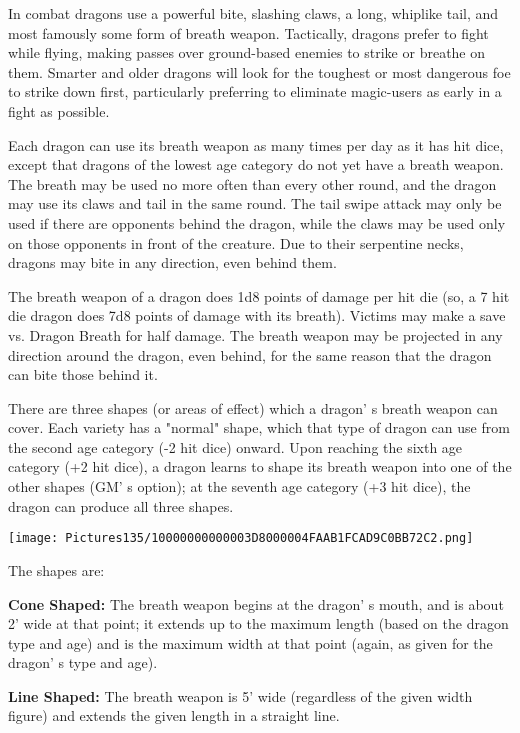 \documentclass[a4paper,twoside,openany,10pt]{book}
\begin{document}
\begin{multicols}{2}
In combat dragons use a powerful bite, slashing claws, a long, whiplike tail, and most famously some form of breath weapon. Tactically, dragons prefer to fight while flying, making passes over ground-based enemies to strike or breathe on them. Smarter and older dragons will look for the toughest or most dangerous foe to strike down first, particularly preferring to eliminate magic-users as early in a fight as possible.

Each dragon can use its breath weapon as many times per day as it has hit dice, except that dragons of the lowest age category do not yet have a breath weapon. The breath may be used no more often than every other round, and the dragon may use its claws and tail in the same round. The tail swipe attack may only be used if there are opponents behind the dragon, while the claws may be used only on those opponents in front of the creature. Due to their serpentine necks, dragons may bite in any direction, even behind them.

The breath weapon of a dragon does 1d8 points of damage per hit die (so, a 7 hit die dragon does 7d8 points of damage with its breath). Victims may make a save vs. Dragon Breath for half damage. The breath weapon may be projected in any direction around the dragon, even behind, for the same reason that the dragon can bite those behind it.

There are three shapes (or areas of effect) which a dragon' s breath weapon can cover. Each variety has a "normal" shape, which that type of dragon can use from the second age category (-2 hit dice) onward. Upon reaching the sixth age category (+2 hit dice), a dragon learns to shape its breath weapon into one of the other shapes (GM' s option); at the seventh age category (+3 hit dice), the dragon can produce all three shapes.


\begin{center}
	\texttt{[image: Pictures135/10000000000003D8000004FAAB1FCAD9C0BB72C2.png]}
\end{center}\medskip

The shapes are:

\textbf{Cone Shaped:} The breath weapon begins at the dragon' s mouth, and is about 2' wide at that point; it extends up to the maximum length (based on the dragon type and age) and is the maximum width at that point (again, as given for the dragon' s type and age).

\textbf{Line Shaped: } The breath weapon is 5' wide (regardless of the given width figure) and extends the given length in a straight line.


\end{multicols}
\end{document}

